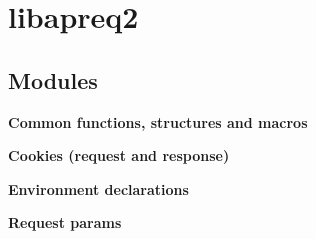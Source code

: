 \section{libapreq2}
\label{group__LIBRARY}
\subsection*{Modules}
\begin{CompactItemize}
\item 
{\bf Common functions, structures and macros}
\item 
{\bf Cookies (request and response)}
\item 
{\bf Environment declarations}
\item 
{\bf Request params}
\end{CompactItemize}
